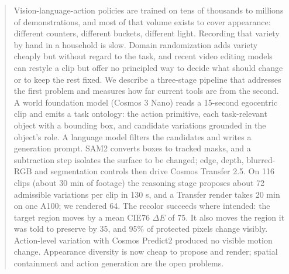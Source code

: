 \begin{abstract}
Vision-language-action policies are trained on tens of thousands to millions of demonstrations, and most of that volume exists to cover appearance: different counters, different buckets, different light. Recording that variety by hand in a household is slow. Domain randomization adds variety cheaply but without regard to the task, and recent video editing models can restyle a clip but offer no principled way to decide what should change or to keep the rest fixed. We describe a three-stage pipeline that addresses the first problem and measures how far current tools are from the second. A world foundation model (Cosmos 3 Nano) reads a 15-second egocentric clip and emits a task ontology: the action primitive, each task-relevant object with a bounding box, and candidate variations grounded in the object's role. A language model filters the candidates and writes a generation prompt. SAM2 converts boxes to tracked masks, and a subtraction step isolates the surface to be changed; edge, depth, blurred-RGB and segmentation controls then drive Cosmos Transfer 2.5. On 116 clips (about 30 min of footage) the reasoning stage proposes about 72 admissible variations per clip in 130 s, and a Transfer render takes 20 min on one A100; we rendered 64. The recolor succeeds where intended: the target region moves by a mean CIE76 $\Delta E$ of 75. It also moves the region it was told to preserve by 35, and 95\% of protected pixels change visibly. Action-level variation with Cosmos Predict2 produced no visible motion change. Appearance diversity is now cheap to propose and render; spatial containment and action generation are the open problems.

\end{abstract}
